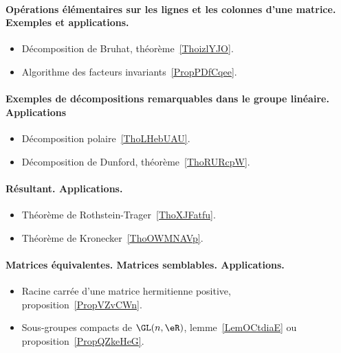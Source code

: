 \paragraph{Opérations élémentaires sur les lignes et les colonnes d’une matrice. Exemples et applications.}
\begin{itemize}
    \item Décomposition de Bruhat, théorème~\ref{ThoizlYJO}.
    \item Algorithme des facteurs invariants~\ref{PropPDfCqee}.
\end{itemize}

\paragraph{Exemples de décompositions remarquables dans le groupe linéaire. Applications}
\begin{itemize}
    \item Décomposition polaire~\ref{ThoLHebUAU}.
    \item Décomposition de Dunford, théorème~\ref{ThoRURcpW}.
\end{itemize}
\paragraph{Résultant. Applications.}
\begin{itemize}
    \item Théorème de Rothstein-Trager~\ref{ThoXJFatfu}.
    \item Théorème de Kronecker~\ref{ThoOWMNAVp}.
\end{itemize}
\paragraph{Matrices équivalentes. Matrices semblables. Applications.}
\begin{itemize}
    \item Racine carrée d'une matrice hermitienne positive, proposition~\ref{PropVZvCWn}.
    \item Sous-groupes compacts de \( \GL(n,\eR)\), lemme~\ref{LemOCtdiaE} ou proposition~\ref{PropQZkeHeG}.
\end{itemize}

